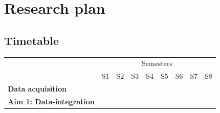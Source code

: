 \documentclass[twoside,fontsize=10pt]{article}
\begin{document}
\section*{Research plan}
\subsection*{Timetable}
\begin{center}

\begin{table}[h]
\begin{tabular}{lllllllll}
                                                & \multicolumn{8}{c}{Semesters}                                                                                                                                                                                                                                                                                                                                                                                 \\ \cline{2-9} 
                                                & S1                                              & S2                                              & S3                                              & S4                                              & S5                                              & S6                                              & S7                                              & S8                                              \\ \hline
\textbf{Data acquisition}                       & \cellcolor[HTML]{343434}{\color[HTML]{656565} } & \cellcolor[HTML]{343434}{\color[HTML]{656565} } & \cellcolor[HTML]{343434}{\color[HTML]{656565} } & \cellcolor[HTML]{343434}{\color[HTML]{656565} } & \cellcolor[HTML]{343434}{\color[HTML]{656565} } & \cellcolor[HTML]{343434}{\color[HTML]{656565} } & \cellcolor[HTML]{343434}{\color[HTML]{656565} } & \cellcolor[HTML]{343434}{\color[HTML]{656565} } \\
\textbf{Aim 1: Data-integration}                & \cellcolor[HTML]{343434}                        & \cellcolor[HTML]{343434}                        & \cellcolor[HTML]{343434}                        &                                                 &                                                 &                                                 &                                                 &                                                 \\

\end{tabular}
\end{table}
\end{center}
\end{document}
